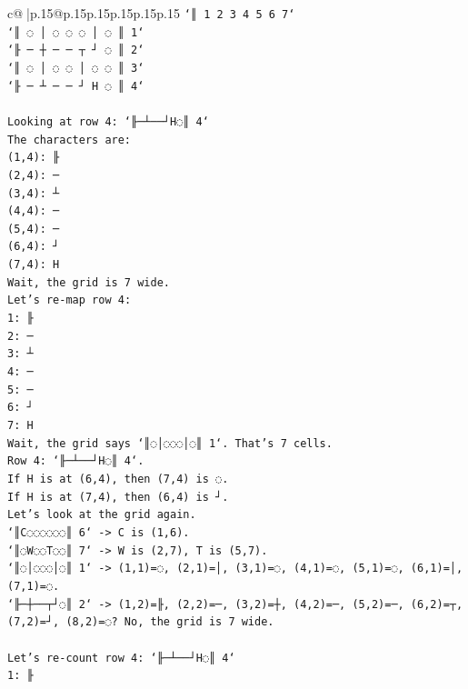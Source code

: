 \documentclass{article}
\begin{document}
{\begin{supertabular}{c@{$\;$}|p{.15\linewidth}@{}p{.15\linewidth}p{.15\linewidth}p{.15\linewidth}p{.15\linewidth}p{.15\linewidth}}
{{{\texttt{`║ 1 2 3 4 5 6 7`} \\
\texttt{`║ ◌ │ ◌ ◌ ◌ │ ◌ ║ 1`} \\
\texttt{`╟ ─ ┼ ─ ─ ┬ ┘ ◌ ║ 2`} \\
\texttt{`║ ◌ │ ◌ ◌ │ ◌ ◌ ║ 3`} \\
\texttt{`╟ ─ ┴ ─ ─ ┘ H ◌ ║ 4`} \\
\\ 
\texttt{Looking at row 4: `╟─┴──┘H◌║ 4`} \\
\texttt{The characters are:} \\
\texttt{(1,4): ╟} \\
\texttt{(2,4): ─} \\
\texttt{(3,4): ┴} \\
\texttt{(4,4): ─} \\
\texttt{(5,4): ─} \\
\texttt{(6,4): ┘} \\
\texttt{(7,4): H} \\
\texttt{Wait, the grid is 7 wide.} \\
\texttt{Let's re{-}map row 4:} \\
\texttt{1: ╟} \\
\texttt{2: ─} \\
\texttt{3: ┴} \\
\texttt{4: ─} \\
\texttt{5: ─} \\
\texttt{6: ┘} \\
\texttt{7: H} \\
\texttt{Wait, the grid says `║◌│◌◌◌│◌║ 1`. That's 7 cells.} \\
\texttt{Row 4: `╟─┴──┘H◌║ 4`.} \\
\texttt{If H is at (6,4), then (7,4) is ◌.} \\
\texttt{If H is at (7,4), then (6,4) is ┘.} \\
\texttt{Let's look at the grid again.} \\
\texttt{`║C◌◌◌◌◌◌║ 6` {-}> C is (1,6).} \\
\texttt{`║◌W◌◌T◌◌║ 7` {-}> W is (2,7), T is (5,7).} \\
\texttt{`║◌│◌◌◌│◌║ 1` {-}> (1,1)=◌, (2,1)=│, (3,1)=◌, (4,1)=◌, (5,1)=◌, (6,1)=│, (7,1)=◌.} \\
\texttt{`╟─┼──┬┘◌║ 2` {-}> (1,2)=╟, (2,2)=─, (3,2)=┼, (4,2)=─, (5,2)=─, (6,2)=┬, (7,2)=┘, (8,2)=◌? No, the grid is 7 wide.} \\
\\ 
\texttt{Let's re{-}count row 4: `╟─┴──┘H◌║ 4`} \\
\texttt{1: ╟} \\
}}}
\end{supertabular}}
\end{document}
